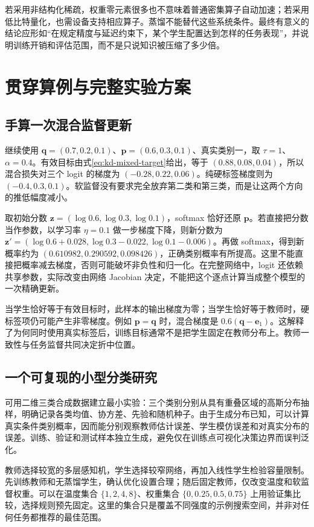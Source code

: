 \documentclass[UTF8,12pt,a4paper,fontset=fandol]{ctexart}
\begin{document}
若采用非结构化稀疏，权重零元素很多也不意味着普通密集算子自动加速；若采用低比特量化，也需设备支持相应算子。蒸馏不能替代这些系统条件。最终有意义的结论应形如“在规定精度与延迟约束下，某个学生配置达到怎样的任务表现”，并说明训练开销和评估范围，而不是只说知识被压缩了多少倍。

\section{贯穿算例与完整实验方案}
\label{sec:kd-example-project}

\subsection{手算一次混合监督更新}
继续使用 $\mathbf q=(0.7,0.2,0.1)$、$\mathbf p=(0.6,0.3,0.1)$、真实类别一，取 $\tau=1$、$\alpha=0.4$。有效目标由式\eqref{eq:kd-mixed-target}给出，等于 $(0.88,0.08,0.04)$，所以混合损失对三个 logit 的梯度为 $(-0.28,0.22,0.06)$。纯硬标签梯度则为 $(-0.4,0.3,0.1)$。软监督没有要求完全放弃第二类和第三类，而是让这两个方向的推低幅度减小。

取初始分数 $\mathbf z=(\log0.6,\log0.3,\log0.1)$，softmax 恰好还原 $\mathbf p$。若直接把分数当作参数，以学习率 $\eta=0.1$ 做一步梯度下降，则新分数为 $\mathbf z'=(\log0.6+0.028,\log0.3-0.022,\log0.1-0.006)$。再做 softmax，得到新概率约为 $(0.610982,0.290592,0.098426)$，正确类别概率有所提高。这里不能直接把概率减去梯度，否则可能破坏非负性和归一化。在完整网络中，logit 还依赖共享参数，实际改变由网络 Jacobian 决定，不能把这个逐点计算当成整个模型的一次精确更新。

当学生恰好等于有效目标时，此样本的输出梯度为零；当学生恰好等于教师时，硬标签项仍可能产生非零梯度。例如 $\mathbf p=\mathbf q$ 时，混合梯度是 $0.6(\mathbf q-\mathbf e_1)$。这解释了为何同时使用真实标签后，训练目标通常不是把学生固定在教师分布上。教师一致性与任务监督共同决定折中位置。

\subsection{一个可复现的小型分类研究}
可用二维三类合成数据建立最小实验：三个类别分别从具有重叠区域的高斯分布抽样，明确记录各类均值、协方差、先验和随机种子。由于生成分布已知，可以计算真实条件类别概率，因而能分别观察教师估计误差、学生模仿误差和对真实分布的误差。训练、验证和测试样本独立生成，避免仅在训练点可视化决策边界而误判泛化。

教师选择较宽的多层感知机，学生选择较窄网络，再加入线性学生检验容量限制。先训练教师和无蒸馏学生，确认优化设置合理；随后固定教师，仅改变温度和软监督权重。可以在温度集合 $\{1,2,4,8\}$、权重集合 $\{0,0.25,0.5,0.75\}$ 上用验证集比较，选择规则预先固定。这里的集合只是覆盖不同强度的示例搜索空间，并非对任何任务都推荐的最佳范围。
\end{document}
